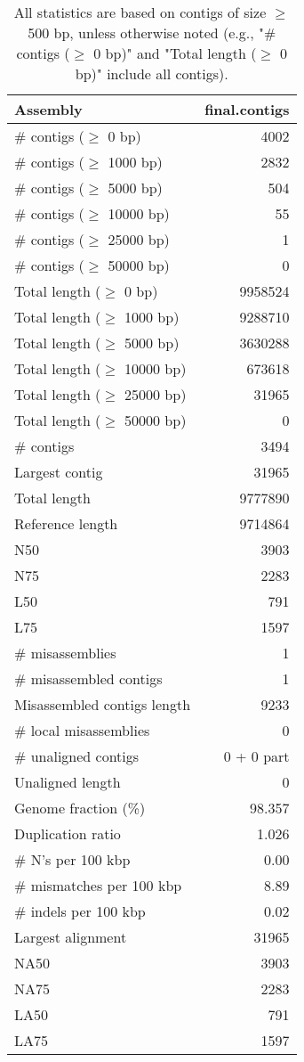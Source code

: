 \documentclass[12pt,a4paper]{article}
\begin{document}
\begin{table}[ht]
\begin{center}
\caption{All statistics are based on contigs of size $\geq$ 500 bp, unless otherwise noted (e.g., "\# contigs ($\geq$ 0 bp)" and "Total length ($\geq$ 0 bp)" include all contigs).}
\begin{tabular}{|l*{1}{|r}|}
\hline
Assembly & final.contigs \\ \hline
\# contigs ($\geq$ 0 bp) & 4002 \\ \hline
\# contigs ($\geq$ 1000 bp) & 2832 \\ \hline
\# contigs ($\geq$ 5000 bp) & 504 \\ \hline
\# contigs ($\geq$ 10000 bp) & 55 \\ \hline
\# contigs ($\geq$ 25000 bp) & 1 \\ \hline
\# contigs ($\geq$ 50000 bp) & 0 \\ \hline
Total length ($\geq$ 0 bp) & 9958524 \\ \hline
Total length ($\geq$ 1000 bp) & 9288710 \\ \hline
Total length ($\geq$ 5000 bp) & 3630288 \\ \hline
Total length ($\geq$ 10000 bp) & 673618 \\ \hline
Total length ($\geq$ 25000 bp) & 31965 \\ \hline
Total length ($\geq$ 50000 bp) & 0 \\ \hline
\# contigs & 3494 \\ \hline
Largest contig & 31965 \\ \hline
Total length & 9777890 \\ \hline
Reference length & 9714864 \\ \hline
N50 & 3903 \\ \hline
N75 & 2283 \\ \hline
L50 & 791 \\ \hline
L75 & 1597 \\ \hline
\# misassemblies & 1 \\ \hline
\# misassembled contigs & 1 \\ \hline
Misassembled contigs length & 9233 \\ \hline
\# local misassemblies & 0 \\ \hline
\# unaligned contigs & 0 + 0 part \\ \hline
Unaligned length & 0 \\ \hline
Genome fraction (\%) & 98.357 \\ \hline
Duplication ratio & 1.026 \\ \hline
\# N's per 100 kbp & 0.00 \\ \hline
\# mismatches per 100 kbp & 8.89 \\ \hline
\# indels per 100 kbp & 0.02 \\ \hline
Largest alignment & 31965 \\ \hline
NA50 & 3903 \\ \hline
NA75 & 2283 \\ \hline
LA50 & 791 \\ \hline
LA75 & 1597 \\ \hline
\end{tabular}
\end{center}
\end{table}
\end{document}
